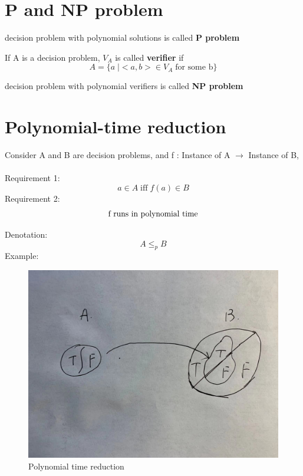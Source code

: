 \documentclass{article}
\begin{document}





\section{P and NP problem} 
\begin{definition}
decision problem with polynomial solutions is called \textbf{P problem}
\end{definition}


If A is a decision problem, $V_{A}$ is called \textbf{verifier} if
\[
A = \{a\; | <a, b> \in V_A  \; \text{for some b} \}
\]
\begin{definition}
decision problem with polynomial verifiers is called \textbf{NP problem}
\end{definition}

\section{Polynomial-time reduction} 
Consider A and B are decision problems, and f : Instance of A $\to$  Instance of B,\\
\\
Requirement 1:
\[
a \in A \; \text{iff} \; f(a) \in B
\]
Requirement 2:
\[
\textmd{f runs in polynomial time}
\]

Denotation:
\[
A \leq_{p} B
\]
Example:
\begin{figure}[h!]
		\begin{center}
			\includegraphics[scale=0.10]{images/fig4}
		\end{center}
		\caption{Polynomial time reduction}
	\end{figure}
\end{document}
